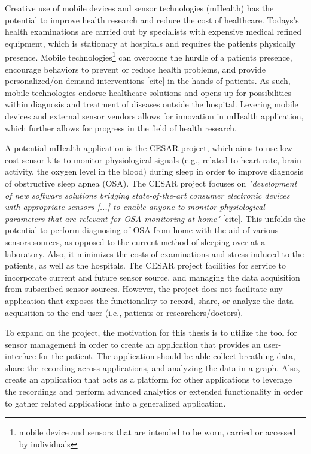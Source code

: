 Creative use of mobile devices and sensor technologies (mHealth) has the potential to improve health research and reduce the cost of healthcare. Todays's health examinations are carried out by specialists with expensive medical refined equipment, which is stationary at hospitals and requires the patients physically presence.  Mobile technologies\footnote{mobile device and sensors that are intended to be worn, carried or accessed by individuals} can overcome the hurdle of a patients presence, encourage behaviors to prevent or reduce health problems, and provide personalized/on-demand interventions [cite] in the hands of patients. As such, mobile technologies endorse healthcare solutions and opens up for possibilities within diagnosis and treatment of diseases outside the hospital. Levering mobile devices and external sensor vendors allows for innovation in mHealth application, which further allows for progress in the field of health research.   

A potential mHealth application is the CESAR project, which aims to use low-cost sensor kits to monitor physiological signals (e.g., related to heart rate, brain activity, the oxygen level in the blood) during sleep in order to improve diagnosis of obstructive sleep apnea (OSA). The CESAR project focuses on \textit{"development of new software solutions bridging state-of-the-art consumer electronic devices with appropriate sensors [...] to enable anyone to monitor physiological parameters that are relevant for OSA monitoring at home"} [cite]. This unfolds the potential to perform diagnosing of OSA from home with the aid of various sensors sources, as opposed to the current method of sleeping over at a laboratory. Also, it minimizes the costs of examinations and stress induced to the patients, as well as the hospitals. The CESAR project facilities for service to incorporate current and future sensor source, and managing the data acquisition from subscribed sensor sources. However, the project does not facilitate any application that exposes the functionality to record, share, or analyze the data acquisition to the end-user (i.e., patients or researchers/doctors). 

To expand on the project, the motivation for this thesis is to utilize the tool for sensor management in order to create an application that provides an user-interface for the patient. The application should be able collect breathing data, share the recording across applications, and analyzing the data in a graph. Also, create an application that acts as a platform for other applications to leverage the recordings and perform advanced analytics or extended functionality in order to gather related applications into a generalized application.

